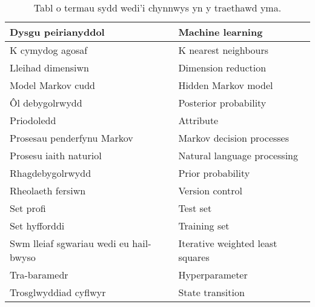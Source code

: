 \begin{table}[htbt!]
\begin{center}
{\begin{tabular}{| p{} | p{} |}
\hline
Dysgu peirianyddol & Machine learning \\
\hline
K cymydog agosaf & K nearest neighbours\\
\hline
Lleihad dimensiwn & Dimension reduction \\
\hline
Model Markov cudd & Hidden Markov model \\
\hline
\^{O}l debygolrwydd & Posterior probability \\
\hline
Priodoledd & Attribute \\
\hline
Prosesau penderfynu Markov & Markov decision processes \\
\hline
Prosesu iaith naturiol & Natural language processing \\
\hline
Rhagdebygolrwydd & Prior probability \\
\hline
Rheolaeth fersiwn & Version control \\
\hline
Set profi & Test set \\
\hline
Set hyfforddi & Training set \\
\hline
Swm lleiaf sgwariau wedi eu hail-bwyso & Iterative weighted least squares \\
\hline
Tra-baramedr & Hyperparameter \\
\hline
Trosglwyddiad cyflwyr & State transition \\
\hline
\end{tabular}%
}
\end{center}
\caption{Tabl o termau sydd wedi'i chynnwys yn y traethawd yma.}
\end{table}

